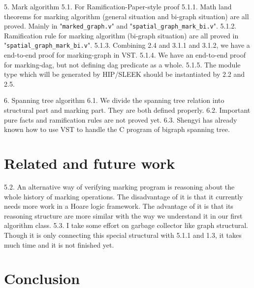 \documentclass[pldi]{sigplanconf-pldi15}
\begin{document}
5. Mark algorithm
5.1. For Ramification-Paper-style proof
5.1.1. Math land theorems for marking algorithm (general situation and bi-graph situation) are all proved. Mainly in "\texttt{marked\_graph.v}" and "\texttt{spatial\_graph\_mark\_bi.v}".
5.1.2. Ramification rule for marking algorithm (bi-graph situation) are all proved in "\texttt{spatial\_graph\_mark\_bi.v}".
5.1.3. Combining 2.4 and 3.1.1 and 3.1.2, we have a end-to-end proof for marking-graph in VST.
5.1.4. We have an end-to-end proof for marking-dag, but not defining dag predicate as a whole.
5.1.5. The module type which will be generated by HIP/SLEEK should be instantiated by 2.2 and 2.5.

6. Spanning tree algorithm
6.1. We divide the spanning tree relation into structural part and marking part. They are both defined properly.
6.2. Important pure facts and ramification rules are not proved yet.
6.3. Shengyi has already known how to use VST to handle the C program of bigraph spanning tree.

\section{Related and future work}

5.2. An alternative way of verifying marking program is reasoning about the whole history of marking operations. The disadvantage of it is that it currently needs more work in a Hoare logic framework. The advantage of it is that its reasoning structure are more similar with the way we understand it in our first algorithm class.
5.3. I take some effort on garbage collector like graph structural. Though it is only connecting this special structural with 5.1.1 and 1.3, it takes much time and it is not finished yet.

\section{Conclusion}



\end{document}
